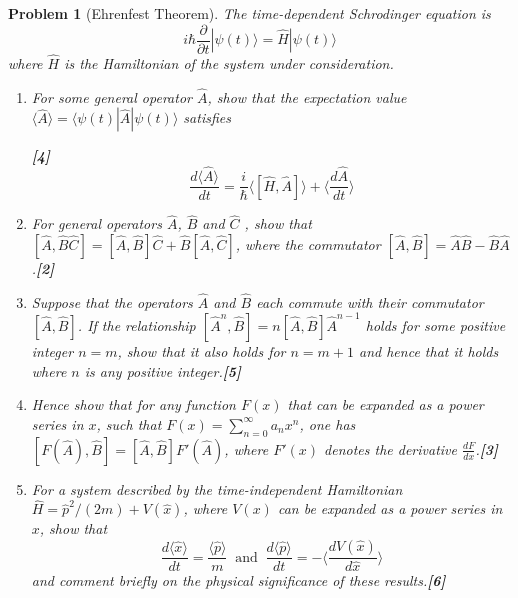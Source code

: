 \documentclass[a4paper]{article}
\theoremstyle{new}
\newtheorem{qns}{Problem}[subsection]
\begin{document}
\newpage
\begin{qns}[Ehrenfest Theorem]
The time-dependent Schrodinger equation is
$$i\hbar\frac{\partial}{\partial t}|\psi(t)\rangle=\hat{H}|\psi(t)\rangle$$
where $\hat{H}$ is the Hamiltonian of the system under consideration.
\begin{enumerate}[label=(\roman*)]
\item For some general operator $\hat{A}$, show that the expectation value $\langle\hat{A}\rangle=\langle\psi(t)|\hat{A}|\psi(t)\rangle$ satisfies

\hfill\textbf{[4]}
$$\frac{d\langle\hat{A}\rangle}{dt}=\frac{i}{\hbar}\langle[\hat{H},\hat{A}]\rangle+\bigg\langle\frac{d\hat{A}}{dt}\bigg\rangle$$
\item For general operators $\hat{A}$, $\hat{B}$ and $\hat{C}$ , show that $[\hat{A},\hat{B}\hat{C}]=[\hat{A},\hat{B}]\hat{C}+\hat{B}[\hat{A},\hat{C}]$, where the commutator $[\hat{A},\hat{B}]=\hat{A}\hat{B}-\hat{B}\hat{A}$.\hfill\textbf{[2]}
\item Suppose that the operators $\hat{A}$ and $\hat{B}$ each commute with their commutator $[\hat{A},\hat{B}]$. If the relationship $[\hat{A}^n,\hat{B}]=n[\hat{A},\hat{B}]\hat{A}^{n-1}$ holds for some positive integer $n = m$, show that it also holds for $n = m + 1$ and hence that it holds where $n$ is any positive integer.\hfill\textbf{[5]}
\item Hence show that for any function $F(x)$ that can be expanded as a power series in $x$, such that $F(x)=\sum_{n=0}^\infty a_nx^n$, one has $[F(\hat{A}),\hat{B}]=[\hat{A},\hat{B}]F'(\hat{A})$, where $F'(x)$ denotes the derivative $\frac{dF}{dx}$.\hfill\textbf{[3]}
\item For a system described by the time-independent Hamiltonian $\hat{H}=\hat{p}^2/(2m)+V(\hat{x})$, where $V(x)$ can be expanded as a power series in $x$, show that
$$\frac{d\langle\hat{x}\rangle}{dt}=\frac{\langle\hat{p}\rangle}{m}~\text{ and }~\frac{d\langle\hat{p}\rangle}{dt}=-\bigg\langle\frac{dV(\hat{x})}{d\hat{x}}\bigg\rangle$$
and comment briefly on the physical significance of these results.\hfill\textbf{[6]}
\end{enumerate}
\end{qns}
\end{document}
